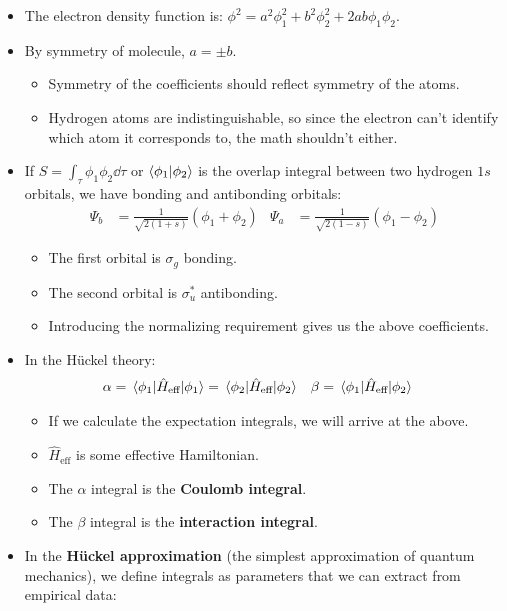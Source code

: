 \documentclass[../notes.tex]{subfiles}
\begin{document}
\begin{itemize}
\begin{itemize}
        \item The electron density function is: $\phi^2=a^2\phi_1^2+b^2\phi_2^2+2ab\phi_1\phi_2$.
        \item By symmetry of  molecule, $a=\pm b$.
        \begin{itemize}
            \item Symmetry of the coefficients should reflect symmetry of the atoms.
            \item Hydrogen atoms are indistinguishable, so since the electron can't identify which atom it corresponds to, the math shouldn't either.
        \end{itemize}
        \item If $S=\int_\tau\phi_1\phi_2\dd{\tau}$ or $\bra{\phi_1}\ket{\phi_2}$ is the overlap integral between two hydrogen $1s$ orbitals, we have bonding and antibonding orbitals:
        \begin{align*}
            \Psi_b &= \frac{1}{\sqrt{2(1+s)}}(\phi_1+\phi_2)&
                \Psi_a &= \frac{1}{\sqrt{2(1-s)}}(\phi_1-\phi_2)
        \end{align*}
        \begin{itemize}
            \item The first orbital is $\sigma_g$ bonding.
            \item The second orbital is $\sigma_u^*$ antibonding.
            \item Introducing the normalizing requirement gives us the above coefficients.
        \end{itemize}
        \item In the H\"{u}ckel theory:
        \begin{align*}
            \alpha &= \ev{\hat{H}_\text{eff}}{\phi_1} = \ev{\hat{H}_\text{eff}}{\phi_2}&
                \beta &= \mel{\phi_1}{\hat{H}_\text{eff}}{\phi_2}
        \end{align*}
        \begin{itemize}
            \item If we calculate the expectation integrals, we will arrive at the above.
            \item $\hat{H}_\text{eff}$ is some effective Hamiltonian.
            \item The $\alpha$ integral is the \textbf{Coulomb integral}.
            \item The $\beta$ integral is the \textbf{interaction integral}.
        \end{itemize}
        \item In the \textbf{H\"{u}ckel approximation} (the simplest approximation of quantum mechanics), we define integrals as parameters that we can extract from empirical data:

\end{itemize}
\end{itemize}
\end{document}
